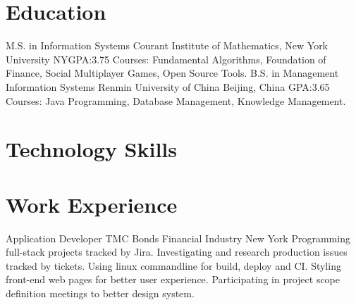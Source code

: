 \documentclass[11pt,a4paper,sans]{moderncv}   %
\begin{document}
\maketitle

\section{Education}
{M.S. in Information Systems}
{Courant Institute of Mathematics, New York University}
{NY}{GPA:3.75}
{Courses: Fundamental Algorithms, Foundation of Finance, Social Multiplayer Games, Open Source Tools.}
{B.S. in Management Information Systems}
{Renmin University of China}
{Beijing, China}
{GPA:3.65}
{Courses: Java Programming, Database Management, Knowledge Management.}

\section{Technology Skills}


\section{Work Experience}
\renewcommand{\baselinestretch}{1.25}


{Application Developer}
{TMC Bonds}
{Financial Industry}
{New York}
{
	{Programming full-stack projects tracked by Jira.}
	\newline
	{Investigating and research production issues tracked by tickets.}
	\newline
	{Using linux commandline for build, deploy and CI.}
	\newline
	{Styling front-end web pages for better user experience.}
	\newline
	{Participating in project scope definition meetings to better design system.}
}
\end{document}

